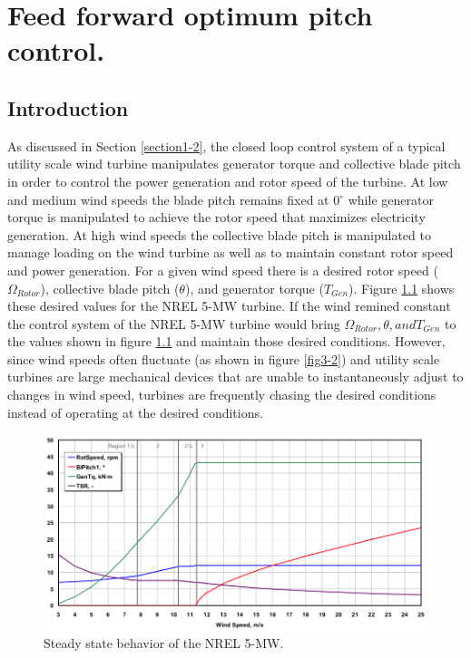 
\chapter{Feed forward optimum pitch control.} %

\label{Chapter3} %



\section{Introduction} \label{section3-1}
As discussed in Section \ref{section1-2}, the closed loop control system of a typical utility scale wind turbine manipulates generator torque and collective blade pitch in order to control the power generation and rotor speed of the turbine. At low and medium wind speeds the blade pitch remains fixed at 0$^\circ$ while generator torque is manipulated to achieve the rotor speed that maximizes electricity generation. At high wind speeds the collective blade pitch is manipulated to manage loading on the wind turbine as well as to maintain constant rotor speed and power generation. For a given wind speed there is a desired rotor speed ($\Omega_{Rotor}$), collective blade pitch ($\theta$), and generator torque ($T_{Gen}$). Figure \ref{fig3-1} shows these desired values for the NREL 5-MW turbine. If the wind remined constant the control system of the NREL 5-MW turbine would bring $\Omega_{Rotor}, \theta, and T_{Gen}$ to the values shown in figure \ref{fig3-1} and maintain those desired conditions. However, since wind speeds often fluctuate (as shown in figure \ref{fig3-2}) and utility scale turbines are large mechanical devices that are unable to instantaneously adjust to changes in wind speed, turbines are frequently chasing the desired conditions instead of operating at the desired conditions.

\begin{figure}[htbp]
	\centering
		\includegraphics[width=\linewidth]{Figures/ch2Figures/fig2-1.png}
		
	\caption{Steady state behavior of the NREL 5-MW.\cite{jonkman2009}}
	\label{fig3-1}
\end{figure}

